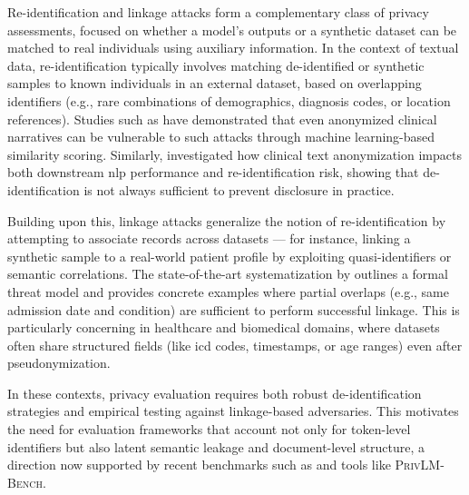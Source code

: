 Re-identification and linkage attacks form a complementary class of privacy assessments, focused on whether a model’s outputs or a synthetic dataset can be matched to real individuals using auxiliary information. In the context of textual data, re-identification typically involves matching de-identified or synthetic samples to known individuals in an external dataset, based on overlapping identifiers (e.g., rare combinations of demographics, diagnosis codes, or location references). Studies such as \citet{manzanares2024reidentification_risk} have demonstrated that even anonymized clinical narratives can be vulnerable to such attacks through machine learning-based similarity scoring. Similarly, \citet{larbi2023clinical_reid} investigated how clinical text anonymization impacts both downstream \gls{nlp} performance and re-identification risk, showing that de-identification is not always sufficient to prevent disclosure in practice.

Building upon this, linkage attacks generalize the notion of re-identification by attempting to associate records across datasets — for instance, linking a synthetic sample to a real-world patient profile by exploiting quasi-identifiers or semantic correlations. The state-of-the-art systematization by \citet{powar2023sok_linkage} outlines a formal threat model and provides concrete examples where partial overlaps (e.g., same admission date and condition) are sufficient to perform successful linkage. This is particularly concerning in healthcare and biomedical domains, where datasets often share structured fields (like \gls{icd} codes, timestamps, or age ranges) even after pseudonymization.

In these contexts, privacy evaluation requires both robust de-identification strategies and empirical testing against linkage-based adversaries. This motivates the need for evaluation frameworks that account not only for token-level identifiers but also latent semantic leakage and document-level structure, a direction now supported by recent benchmarks such as \citet{huang2024privacy_eval_nlp} and tools like \textsc{PrivLM-Bench}.
